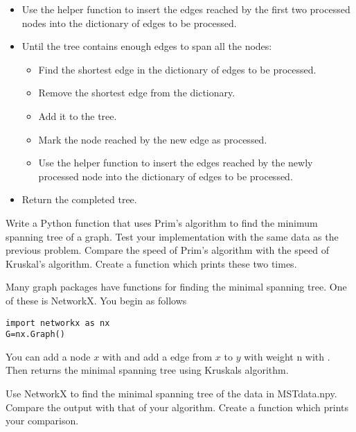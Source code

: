 \begin{itemize}
\begin{itemize}
	\end{itemize}

\item Use the helper function to insert the edges reached by the first two processed nodes into the dictionary of edges to be processed.

\item Until the tree contains enough edges to span all the nodes:

	\begin{itemize}

	\item Find the shortest edge in the dictionary of edges to be processed.

	\item Remove the shortest edge from the dictionary.

	\item Add it to the tree.

	\item Mark the node reached by the new edge as processed.

	\item Use the helper function to insert the edges reached by the newly processed node into the dictionary of edges to be processed.

	\end{itemize}

\item Return the completed tree.

\end{itemize}

\begin{problem}
Write a Python function that uses Prim's algorithm to find the minimum spanning tree of a graph.
Test your implementation with the same data as the previous problem.
Compare the speed of Prim's algorithm with the speed of Kruskal's algorithm.
Create a function which prints these two times.
\end{problem}

Many graph packages have functions for finding the minimal spanning tree. One of these is NetworkX. You begin as follows
\begin{lstlisting}
import networkx as nx
G=nx.Graph()
\end{lstlisting}
You can add a node $x$ with  and add a edge from $x$ to $y$ with weight n with . Then  returns the minimal spanning tree using Kruskals algorithm.

\begin{problem}
Use NetworkX to find the minimal spanning tree of the data in MSTdata.npy. 
Compare the output with that of your algorithm.
Create a function which prints your comparison.
\end{problem}

